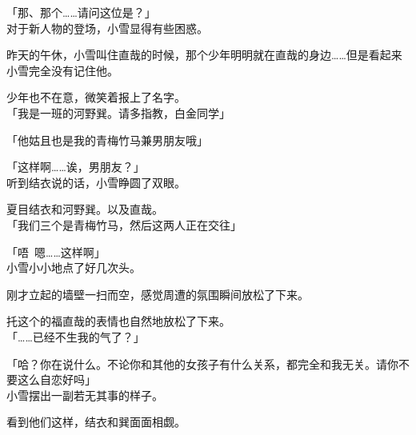 「那、那个……请问这位是？」\\

对于新人物的登场，小雪显得有些困惑。

昨天的午休，小雪叫住直哉的时候，那个少年明明就在直哉的身边……但是看起来小雪完全没有记住他。

少年也不在意，微笑着报上了名字。\\

「我是一班的河野巽。请多指教，白金同学」

「他姑且也是我的青梅竹马兼男朋友哦」

「这样啊……诶，男朋友？」\\

听到结衣说的话，小雪睁圆了双眼。

夏目结衣和河野巽。以及直哉。\\

「我们三个是青梅竹马，然后这两人正在交往」

「唔~嗯……这样啊」\\

小雪小小地点了好几次头。

刚才立起的墙壁一扫而空，感觉周遭的氛围瞬间放松了下来。

托这个的福直哉的表情也自然地放松了下来。\\

「……已经不生我的气了？」

「哈？你在说什么。不论你和其他的女孩子有什么关系，都完全和我无关。请你不要这么自恋好吗」\\

小雪摆出一副若无其事的样子。

看到他们这样，结衣和巽面面相觑。

